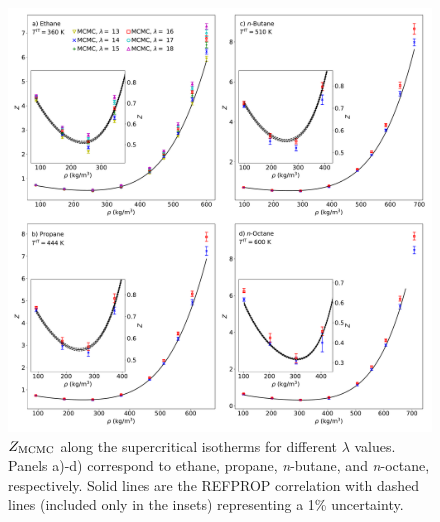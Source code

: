 \documentclass[journal=jctc,manuscript=article]{achemso}
\begin{document}
\begin{figure}[p!]
	\centering
	\includegraphics[width=6.4in]{MCMC_Mie_ZIT_alkanes}
	\caption{$Z_{\rm MCMC}$ along the supercritical isotherms for different $\lambda$ values. Panels a)-d) correspond to ethane, propane, \textit{n}-butane, and \textit{n}-octane, respectively. Solid lines are the REFPROP correlation with dashed lines (included only in the insets) representing a 1\% uncertainty.}
	\label{fig:MCMC_Mie_ZIT_alkanes}
\end{figure} 
\end{document}
